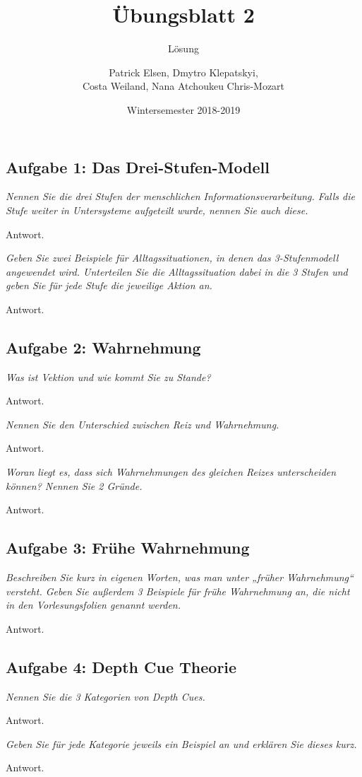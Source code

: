 \documentclass[
  ngerman,
  DIV=14
]{scrartcl}
\title{Übungsblatt 2}
\subtitle{Lösung}
\author{Patrick Elsen, Dmytro Klepatskyi,\\Costa Weiland, Nana Atchoukeu Chris-Mozart}
\date{Wintersemester 2018-2019}
\begin{document}
\maketitle

\subsection*{Aufgabe 1: Das Drei-Stufen-Modell}
\emph{Nennen Sie die drei Stufen der menschlichen Informationsverarbeitung. Falls die Stufe weiter in Untersysteme aufgeteilt wurde, nennen Sie auch diese.}
\par\medskip\noindent
Antwort.

\bigskip\noindent
\emph{Geben Sie zwei Beispiele für Alltagssituationen, in denen das 3-Stufenmodell angewendet wird. Unterteilen Sie die Alltagssituation dabei in die 3 Stufen und geben Sie für jede Stufe die jeweilige Aktion an.}
\par\medskip\noindent
Antwort.

\subsection*{Aufgabe 2: Wahrnehmung}
\emph{Was ist Vektion und wie kommt Sie zu Stande?}
\par\medskip\noindent
Antwort.

\bigskip\noindent
\emph{Nennen Sie den Unterschied zwischen Reiz und Wahrnehmung.}
\par\medskip\noindent
Antwort.

\bigskip\noindent
\emph{Woran liegt es, dass sich Wahrnehmungen des gleichen Reizes unterscheiden können? Nennen Sie 2 Gründe.}
\par\medskip\noindent
Antwort.

\subsection*{Aufgabe 3: Frühe Wahrnehmung}
\emph{Beschreiben Sie kurz in eigenen Worten, was man unter „früher Wahrnehmung“ versteht. Geben Sie außerdem 3 Beispiele für frühe Wahrnehmung an, die nicht in den Vorlesungsfolien genannt werden.}
\par\medskip\noindent
Antwort.

\subsection*{Aufgabe 4: Depth Cue Theorie}
\emph{Nennen Sie die 3 Kategorien von Depth Cues.}
\par\medskip\noindent
Antwort.

\bigskip\noindent
\emph{Geben Sie für jede Kategorie jeweils ein Beispiel an und erklären Sie dieses kurz.}
\par\medskip\noindent
Antwort.
\end{document}

